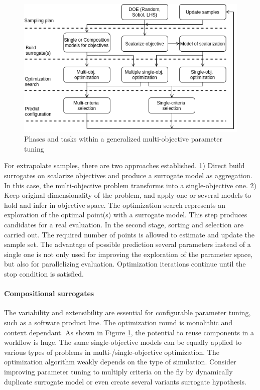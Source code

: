             \begin{figure}
                \centering
                \includegraphics[width=\textwidth]{content/images/tax_mb_tuning.png}
                \caption[Phases and tasks within a generalized multi-objective parameter tuning]{Phases and tasks within a generalized multi-objective parameter tuning}
                \label{fig:mo_param_tuning}
            \end{figure}

            For extrapolate samples, there are two approaches established. 1) Direct build surrogates on scalarize objectives and produce a surrogate model as aggregation. In this case, the multi-objective problem transforms into a single-objective one. 2) Keep original dimensionality of the problem, and apply one or several models to hold and infer in objective space.
            The optimization search represents an exploration of the optimal point(s) with a surrogate model. This step produces candidates for a real evaluation. In the second stage, sorting and selection are carried out. The required number of points is allowed to estimate and update the sample set. The advantage of possible prediction several parameters instead of a single one is not only used for improving the exploration of the parameter space, but also for parallelizing evaluation.  Optimization iterations continue until the stop condition is satisfied.
    
    
            \paragraph{Compositional surrogates}
            The variability and extensibility are essential for configurable parameter tuning, such as a software product line. The optimization round is monolithic and context dependant. As shown in Figure \ref{fig:mo_param_tuning}, the potential to reuse components in a workflow is huge. The same single-objective models can be equally applied to various types of problems in multi-/single-objective optimization. The optimization algorithm weakly depends on the type of simulation. 
            Consider improving parameter tuning to multiply criteria on the fly by dynamically duplicate surrogate model or even create several variants surrogate hypothesis.

